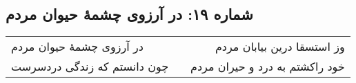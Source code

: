 \begin{center}
\section*{شماره ۱۹: در آرزوی چشمۀ حیوان مردم}
\label{sec:019}
\begin{longtable}{l p{0.5cm} r}
در آرزوی چشمهٔ حیوان مردم
&&
وز استسقا درین بیابان مردم
\\
چون دانستم که زندگی دردسرست
&&
خود راکشتم به درد و حیران مردم
\\
\end{longtable}
\end{center}
